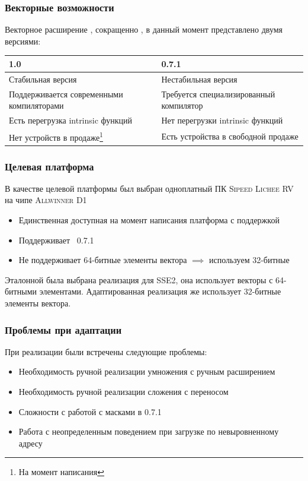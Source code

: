 \documentclass[aspectratio=169]{beamer}
\begin{document}
\begin{frame}
	\frametitle{Векторные возможности \riscv{}}

	Векторное расширение \riscv{}, сокращенно \rvv{}, в данный момент представлено двумя версиями:
	\begin{center}
		\begin{tabularx}{0.8\linewidth}{XX}
			\toprule
			\rvv{} 1.0 & \rvv{} 0.7.1 \\ \midrule
			Стабильная версия & Нестабильная версия \\ \midrule
			Поддерживается современными компиляторами & Требуется специализированный компилятор \\ \midrule
			Есть перегрузка intrinsic функций & Нет перегрузки intrinsic функций \\ \midrule
			Нет устройств в продаже\footnote{На момент написания} & Есть устройства в свободной продаже \\
			\bottomrule
		\end{tabularx}
	\end{center}
\end{frame}

\begin{frame}
	\frametitle{Целевая платформа}

	В качестве целевой платформы был выбран одноплатный ПК \textsc{Sipeed Lichee RV} на чипе \textsc{Allwinner D1}
	\begin{itemize}
		\item Единственная доступная на момент написания платформа с поддержкой \rvv{}
		\item Поддерживает \rvv{}~0.7.1
		\item Не поддерживает 64-битные элементы вектора $\implies$ используем 32-битные
	\end{itemize}
	Эталонной была выбрана реализация для SSE2, она использует векторы с 64-битными элементами.
	Адаптированная реализация же использует 32-битные элементы вектора.
\end{frame}

\begin{frame}
	\frametitle{Проблемы при адаптации}
	При реализации были встречены следующие проблемы:
	\begin{itemize}
		\item Необходимость ручной реализации умножения с ручным расширением
		\item Необходимость ручной реализации сложения с переносом
		\item Сложности с работой с масками в \rvv{} 0.7.1
		\item Работа с неопределенным поведением при загрузке по невыровненному адресу
	\end{itemize}
\end{frame}
\end{document}
